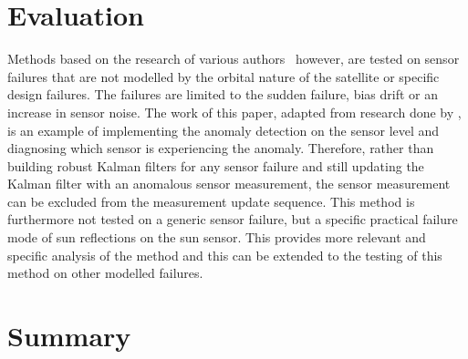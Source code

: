 \section{Evaluation}
Methods based on the research of various authors~\cite{wang2019adaptive, Xiong2007, Zhou2016, Nasrolahi2018} however, are tested on sensor failures that are not modelled by the orbital nature of the satellite or specific design failures. The failures are limited to the sudden failure, bias drift or an increase in sensor noise. The work of this paper, adapted from research done by \cite{DeSilva2020}, is an example of implementing the anomaly detection on the sensor level and diagnosing which sensor is experiencing the anomaly. Therefore, rather than building robust Kalman filters for any sensor failure and still updating the Kalman filter with an anomalous sensor measurement, the sensor measurement can be excluded from the measurement update sequence. 
This method is furthermore not tested on a generic sensor failure, but a specific practical failure mode of sun reflections on the sun sensor. This provides more relevant and specific analysis of the method and this can be extended to the testing of this method on other modelled failures.

\section{Summary}

